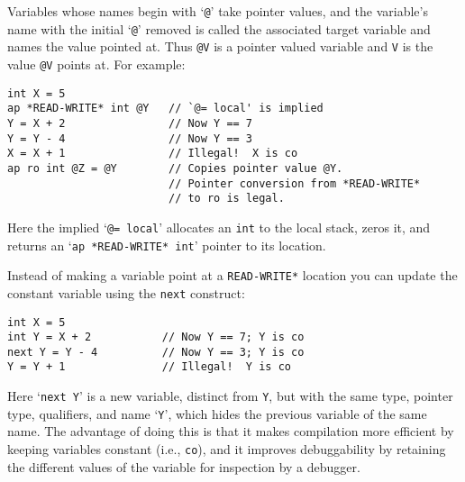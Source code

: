 \documentclass[12pt]{article}
\newenvironment{indpar}[1][0.3in]%
	{\begin{list}{}%
		     {\setlength{\itemsep}{0in}%
		      \setlength{\topsep}{0in}%
		      \setlength{\parsep}{1ex}%
		      \setlength{\labelwidth}{#1}%
		      \setlength{\leftmargin}{#1}%
		      \addtolength{\leftmargin}{\labelsep}}%
	 \item}%
	{\end{list}}
\begin{document}
Variables whose names begin with `{\tt @}' take pointer values, and
the variable's name with the
initial `{\tt @}' removed is called the associated
target variable and names the value pointed at.
Thus {\tt @V} is a pointer valued variable and {\tt V} is the value
{\tt @V} points at.
For example:

\begin{indpar}\begin{verbatim}
int X = 5
ap *READ-WRITE* int @Y   // `@= local' is implied
Y = X + 2                // Now Y == 7
Y = Y - 4                // Now Y == 3
X = X + 1                // Illegal!  X is co
ap ro int @Z = @Y        // Copies pointer value @Y.
                         // Pointer conversion from *READ-WRITE*
                         // to ro is legal.
\end{verbatim}\end{indpar}

Here the implied `{\tt @= local}' allocates an {\tt int} to the local
stack, zeros it, and returns an `{\tt ap *READ-WRITE* int}'
pointer to its location.

Instead of making a variable point at a {\tt *READ-WRITE*} location you
can update the constant variable using the {\tt next} construct:
\begin{indpar}\begin{verbatim}
int X = 5
int Y = X + 2           // Now Y == 7; Y is co
next Y = Y - 4          // Now Y == 3; Y is co
Y = Y + 1               // Illegal!  Y is co
\end{verbatim}\end{indpar}
Here `{\tt next Y}' is a new variable, distinct from {\tt Y},
but with the same type, pointer type, qualifiers, and name `{\tt Y}',
which hides the previous variable of the same name.
The advantage of doing this is that it makes compilation more
efficient by keeping variables constant (i.e., {\tt co}), and
it improves debuggability by retaining the different values of
the variable for inspection by a debugger.
\end{document}
